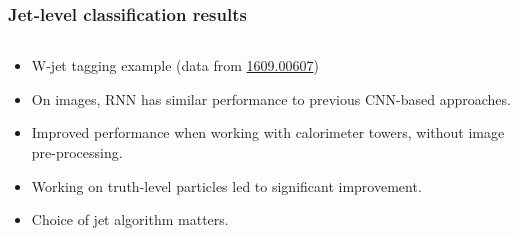 \documentclass{beamer}
\begin{document}
\begin{frame}
    \frametitle{Jet-level classification results}

    \begin{columns}
        \begin{column}{0.65\textwidth}
            {\scriptsize
            \begin{itemize}
                \item W-jet tagging example (data from \href{https://arxiv.org/abs/1609.00607}{1609.00607})
                \item On images, RNN has similar performance to previous CNN-based approaches.
                \item Improved performance when working with calorimeter towers, without image pre-processing.
                \item Working on truth-level particles led to significant improvement.
                \item Choice of jet algorithm matters.
            \end{itemize}}


\end{column}
\end{columns}
\end{frame}
\end{document}
